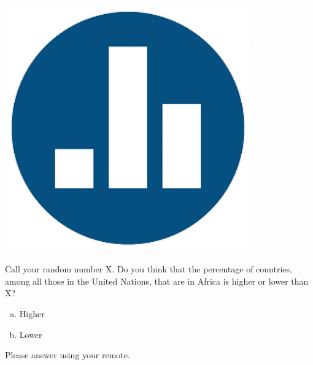 \begin{frame}

\frametitle{\includegraphics[scale = 0.05]{./images/clicker}}

Call your random number X. Do you think that the \alert{percentage} of countries, among all those in the United Nations, that are in Africa is \alert{higher} or \alert{lower} than X?

\begin{enumerate}[(a)]
	\item Higher
	\item Lower
\end{enumerate}

Please answer using your remote.

\end{frame}


